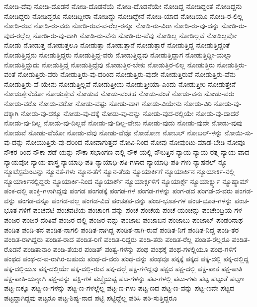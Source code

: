 {ನೋಡಿ-ದೆವು
ನೋಡಿ-ದೊಡನೆ
ನೋಡಿ-ದೊಡನೆಯೆ
ನೋಡಿ-ದೊಡನೆಯೇ
ನೋಡಿದ್ದ
ನೋಡಿದ್ದಂತೆ
ನೋಡಿದ್ದನು
ನೋಡಿದ್ದರು
ನೋಡಿದ್ದರೂ
ನೋಡಿದ್ದೀರಾ
ನೋಡಿದ್ದು
ನೋಡಿದ್ದೇನೆ
ನೋಡಿ-ಯಾದ
ನೋಡಿಯೂ
ನೋಡಿ-ರ-ಲಿಲ್ಲ
ನೋಡಿ-ರುವ
ನೋಡಿ-ರು-ವರು
ನೋಡಿ-ರುವ-ವ-ರೆಲ್ಲ-ರನ್ನೂ
ನೋಡಿ-ರು-ವಿರಾ
ನೋಡಿ-ರು-ವು-ದನ್ನು
ನೋಡಿ-ರು-ವುದ-ರಲ್ಲೆಲ್ಲ
ನೋಡಿ-ರು-ವು-ದಾಗಿ
ನೋಡಿ-ರು-ವೆನು
ನೋಡಿ-ರು-ವೆವು
ನೋಡಿಲ್ಲ
ನೋಡಿಲ್ಲವೆ
ನೋಡಿಲ್ಲವೋ
ನೋಡು
ನೋಡುತ್ತ
ನೋಡುತ್ತಲೂ
ನೋಡುತ್ತಾ
ನೋಡುತ್ತಾನೆ
ನೋಡುತ್ತಾರೆ
ನೋಡುತ್ತಿದ್ದ
ನೋಡುತ್ತಿದ್ದಂತೆ
ನೋಡುತ್ತಿದ್ದನು
ನೋಡುತ್ತಿದ್ದರು
ನೋಡುತ್ತಿದ್ದ-ವರು
ನೋಡುತ್ತಿದ್ದವು
ನೋಡುತ್ತಿದ್ದಾಗ
ನೋಡುತ್ತಿದ್ದೀ-ಯಲ್ಲಾ
ನೋಡುತ್ತಿದ್ದುದು
ನೋಡುತ್ತಿದ್ದೆ
ನೋಡುತ್ತಿದ್ದೆವು
ನೋಡುತ್ತಿರ-ಬೇಕು
ನೋಡುತ್ತಿರ-ಲಿಲ್ಲ
ನೋಡುತ್ತಿರು
ನೋಡುತ್ತಿರು-ವಂತೆ
ನೋಡುತ್ತಿರು-ವರು
ನೋಡುತ್ತಿರು-ವು-ದರಿಂದ
ನೋಡುತ್ತಿರು-ವುದೇ
ನೋಡುತ್ತಿರುವೆ
ನೋಡುತ್ತಿರು-ವೆನು
ನೋಡುತ್ತಿರು-ವೆ-ಯೇನು
ನೋಡುತ್ತಿಲ್ಲವೆ
ನೋಡುತ್ತೀಯ
ನೋಡುತ್ತೀಯಾ-ಎಂದು
ನೋಡುತ್ತೀರಿ
ನೋಡುತ್ತೇನೆ
ನೋಡುತ್ತೇನೆಯೋ
ನೋಡುತ್ತೇವೆ
ನೋಡುವ
ನೋಡು-ವಂತಹ
ನೋಡು-ವಂತೆ
ನೋಡು-ವನು
ನೋಡು-ವರು
ನೋಡು-ವರೊ
ನೋಡು-ವರೋ
ನೋಡು-ವಷ್ಟು
ನೋಡು-ವಾಗ
ನೋಡು-ವಿಯೇನು
ನೋಡು-ವಿರಿ
ನೋಡು-ವು-ದಕ್ಕಾಗಿ
ನೋಡು-ವು-ದಕ್ಕೂ
ನೋಡು-ವು-ದಕ್ಕೆ
ನೋಡು-ವು-ದನ್ನು
ನೋಡು-ವುದ-ರಲ್ಲಿಯೇ
ನೋಡು-ವು-ದಾದರೆ
ನೋಡು-ವು-ದಿಲ್ಲ
ನೋಡು-ವು-ದಿಲ್ಲವೆ
ನೋಡು-ವು-ದಿಲ್ಲ-ವೇನು
ನೋಡು-ವುದು
ನೋಡು-ವುದೇ
ನೋಡು-ವುವು
ನೋಡುವೆ
ನೋಡು-ವೆಯೋ
ನೋಡು-ವೆವು
ನೋಡು-ವೆವೊ
ನೋಡೋಣ
ನೋಬಲ್
ನೋಬಲ್-ಳನ್ನು
ನೋಯಿ-ಸು-ವು-ದನ್ನು
ನೋಯುತ್ತಿರು-ವು-ದರಿಂದ
ನೋವಾಗುತ್ತದೆ
ನೋವಿ-ನಿಂದ
ನೋವು
ನೋವುಂಟು-ಮಾಡ-ಬೇಡಿ
ನೋವೂ
ನೌಕರ-ರಿಂದ
ನೌಕಾ-ಪಡೆ-ಯನ್ನು
ನೌಕಾ-ಸಭಾಂಗಣ-ದಲ್ಲಿ
ನೌಕೆ-ಯಲ್ಲಿ
ನೌಬತ್ತಿನ
ನ್ಯಾಯ
ನ್ಯಾಯ-ರತ್ನ
ನ್ಯಾಯ-ವಾದ
ನ್ಯಾಯವೋ
ನ್ಯಾಯ-ಶಾಸ್ತ್ರ
ನ್ಯಾಯಾಧಿ-ಪತಿ
ನ್ಯಾಯಾಧಿ-ಪತಿ-ಗಳಾದ
ನ್ಯಾಯಾಧಿ-ಪತಿ-ಗಳು
ನ್ಯಾಷನಲ್
ನ್ಯೂ
ನ್ಯೂಟೆಸ್ಟಮೆಂಟನ್ನು
ನ್ಯೂನತೆ-ಗಳು
ನ್ಯೂನ-ತೆಗೆ
ನ್ಯೂನ-ತೆಯ
ನ್ಯೂಯಾರ್ಕಿಗೆ
ನ್ಯೂಯಾರ್ಕಿನ
ನ್ಯೂಯಾರ್ಕಿ-ನಲ್ಲಿ
ನ್ಯೂಯಾರ್ಕಿನಲ್ಲಿದ್ದರು
ನ್ಯೂಯಾರ್ಕಿ-ನಿಂದ
ನ್ಯೂಯಾರ್ಕ್
ನ್ಯೂಯಾರ್ಕ್ಗಳಿಗೆ
ನ್ಯೂಯಾರ್ಕ್ಗೆ
ನ್ಯೂಯಾರ್ಕ್ನ್ನು
ನ್ಯೂಹ್ಯಾಮ್
ಪಂಕ-ದಲ್ಲಿ
ಪಂಕ್ತಿ-ಗಳಾಗಿದ್ದವು
ಪಂಗಡ
ಪಂಗಡಕ್ಕೆ
ಪಂಗಡ-ಗಳ
ಪಂಗಡ-ಗಳನ್ನು
ಪಂಗ-ಡದ
ಪಂಗಡ-ದ-ವರು
ಪಂಗಡ-ವನ್ನು
ಪಂಗಡ-ವನ್ನೂ
ಪಂಗಡ-ವಲ್ಲ
ಪಂಗಡ-ವಿದೆ
ಪಂಚತಪ-ವನ್ನು
ಪಂಚ-ಭೂತ-ಗಳ
ಪಂಚ-ಭೂತ-ಗಳನ್ನು
ಪಂಚ-ಭೂತ-ಗಳಿಗೆ
ಪಂಚವಟಿ
ಪಂಚವಟಿಯ
ಪಂಚಾಂಗ-ವನ್ನು
ಪಂಚೆ
ಪಂಚೆಯ
ಪಂಚೆ-ಯಂಚನ್ನು
ಪಂಚೇಂದ್ರಿಯ-ಗಳ
ಪಂಜರ
ಪಂಜರ-ದಂತಿವೆ
ಪಂಜರ-ದಲ್ಲಿ
ಪಂಜರ-ವನ್ನು
ಪಂಜಾಬಿ
ಪಂಜಾಬಿನ
ಪಂಜಾಬು
ಪಂಜಾಬ್
ಪಂಡರಿನಾಥ
ಪಂಡಿತ
ಪಂಡಿ-ತನ
ಪಂಡಿತ-ನಾಗಲಿ
ಪಂಡಿತ-ನಾಗಿದ್ದ
ಪಂಡಿತ-ನಾಗಿ-ರುವೆ
ಪಂಡಿತ-ನಿಗೆ
ಪಂಡಿತ-ನಿದ್ದ
ಪಂಡಿ-ತರ
ಪಂಡಿತ-ರಾಗಿದ್ದರು
ಪಂಡಿತ-ರಾದ
ಪಂಡಿತ-ರಿಗೆ
ಪಂಡಿತ-ರಿದ್ದರು
ಪಂಡಿ-ತರು
ಪಂಡಿತ-ರೆಲ್ಲ
ಪಂಡಿತ-ರೆಲ್ಲರೂ
ಪಂಡಿತ-ರೊಡನೆ
ಪಂಡಿತಾನಾಂ
ಪಂಡಿ-ತೆಯರ
ಪಂಡಿತ್
ಪಂತ್ವ-ಗಳನ್ನು
ಪಂಥ
ಪಂಥಕ್ಕೆ
ಪಂಥ-ಗಳಲ್ಲಿಯೂ
ಪಂಥ-ಗಳಿಗೆ
ಪಂಥದ
ಪಂಥ-ದ-ವ-ರಾಗಿರ-ಬಹುದು
ಪಂಥ-ದ-ವರು
ಪಂಥ-ವನ್ನು
ಪಂಥವೂ
ಪಕ್ಕಕ್ಕೆ
ಪಕ್ಕದ
ಪಕ್ಕ-ದಲ್ಲಿ
ಪಕ್ಕ-ದಲ್ಲಿದ್ದ
ಪಕ್ಕ-ದಲ್ಲಿಯೂ
ಪಕ್ಕ-ದಲ್ಲಿಯೇ
ಪಕ್ಕ-ದಲ್ಲಿ-ರುವ
ಪಕ್ಕ-ದಲ್ಲೆ
ಪಕ್ಷ-ಗಳಿದ್ದವು
ಪಕ್ಷದ
ಪಕ್ಷ-ದಲ್ಲಿ
ಪಕ್ಷ-ಪಾತ
ಪಕ್ಷ-ಪಾತಿ
ಪಕ್ಷ-ಪಾತಿ-ಯನ್ನಾಗಿ
ಪಕ್ಷ-ವನ್ನು
ಪಕ್ಷಿ-ಗಳ
ಪಚ್ಚೈಯಪ್ಪ
ಪಟ-ಗಳನ್ನು
ಪಟ-ಗಳಲ್ಲಿ
ಪಟು-ಗಳು
ಪಟ್ಟ
ಪಟ್ಟಂತೆ
ಪಟ್ಟಣ
ಪಟ್ಟ-ಣಕ್ಕೂ
ಪಟ್ಟ-ಣ-ಗಳನ್ನು
ಪಟ್ಟ-ಣ-ಗಳಲ್ಲೆಲ್ಲ
ಪಟ್ಟ-ಣ-ಗಳು
ಪಟ್ಟ-ಣದ
ಪಟ್ಟ-ಣ-ವನ್ನು
ಪಟ್ಟ-ಣವೇ
ಪಟ್ಟದ
ಪಟ್ಟದ್ದಾಗಿದ್ದವು
ಪಟ್ಟರೂ
ಪಟ್ಟ-ಶಿಷ್ಯ-ನಾದ
ಪಟ್ಟಿ
ಪಟ್ಟಿದ್ದೆಲ್ಲ
ಪಠಿಸಿ
ಪಠಿ-ಸುತ್ತಿದ್ದರೂ
}
